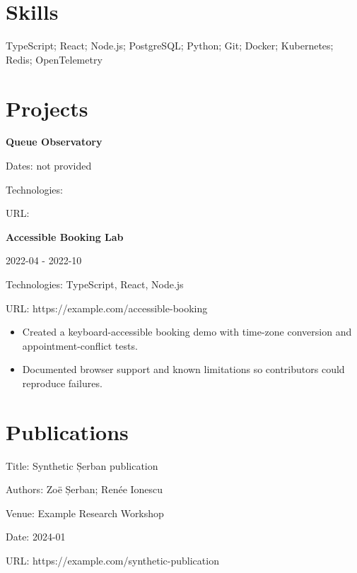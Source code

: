 \documentclass[11pt,a4paper]{article}
\begin{document}
\section*{Skills}
TypeScript; React; Node.js; PostgreSQL; Python; Git; Docker; Kubernetes; Redis; OpenTelemetry
\section*{Projects}
\textbf{Queue Observatory}\par
Dates: not provided\par
Technologies: \par
URL: \par
{}
\textbf{Accessible Booking Lab}\par
2022-04 - 2022-10\par
Technologies: TypeScript, React, Node.js\par
URL: https://example.com/accessible-booking\par
\begin{itemize}
\item Created a keyboard-accessible booking demo with time-zone conversion and appointment-conflict tests.
\item Documented browser support and known limitations so contributors could reproduce failures.
\end{itemize}
\section*{Publications}
Title: Synthetic Șerban publication\par
Authors: Zoë Șerban; Renée Ionescu\par
Venue: Example Research Workshop\par
Date: 2024-01\par
URL: https://example.com/synthetic-publication\par
\end{document}
